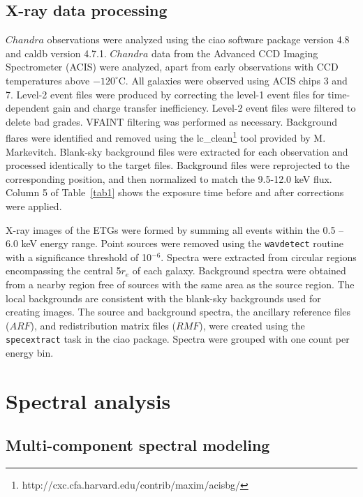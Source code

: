 \documentclass[iop]{emulateapj}
\begin{document}
\subsection{X-ray data processing}

$Chandra$ observations were analyzed using the {\sc ciao} software package version 4.8 and {\sc caldb} version 4.7.1. $Chandra$ data from the Advanced CCD Imaging Spectrometer (ACIS) were analyzed, apart from early observations with CCD temperatures above $-120^{\circ}$C. All galaxies were observed using ACIS chips 3 and 7. Level-2 event files were produced by correcting the level-1 event files for time-dependent gain and charge transfer inefficiency.  Level-2 event files were filtered to delete bad grades.  VFAINT filtering was performed as necessary. Background flares were identified and removed using the {\sc lc\_clean}\footnote{http://cxc.cfa.harvard.edu/contrib/maxim/acisbg/} tool provided by M. Markevitch.  Blank-sky background files were extracted for each observation and processed identically to the target files.  Background files were reprojected to the corresponding position, and then normalized to match the 9.5-12.0 keV flux. Column 5 of Table~\ref{tab1} shows the exposure time before and after corrections were applied.

X-ray images of the ETGs were formed by summing all events within the 0.5 -- 6.0 keV energy range. Point sources were removed using the \texttt{wavdetect} routine with a significance threshold of 10$^{-6}$. Spectra were extracted from circular regions encompassing the central 5$r_e$ of each galaxy. Background spectra were obtained from a nearby region free of sources with the same area as the source region. The local backgrounds are consistent with the blank-sky backgrounds used for creating images. The source and background spectra, the ancillary reference files ($ARF$), and redistribution matrix files ($RMF$), were created using the \texttt{specextract} task in the {\sc ciao} package. Spectra were grouped with one count per energy bin.

\section{Spectral analysis}\label{sec_spec_anal}

\subsection{Multi-component spectral modeling}
\end{document}
